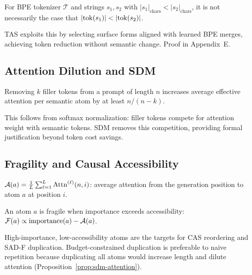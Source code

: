 \begin{theorem}
\label{thm:non-monotonicity}
For BPE tokenizer $\mathcal{T}$ and strings $s_1, s_2$ with $|s_1|_\text{chars} < |s_2|_\text{chars}$, it is not necessarily the case that $|\mathrm{tok}(s_1)| < |\mathrm{tok}(s_2)|$.
\end{theorem}

TAS exploits this by selecting surface forms aligned with learned BPE merges, achieving token reduction without semantic change.
Proof in Appendix~E.

\subsection{Attention Dilution and SDM}

\begin{proposition}
\label{prop:sdm-attention}
Removing $k$ filler tokens from a prompt of length $n$ increases average effective attention per semantic atom by at least $n/(n-k)$.
\end{proposition}

This follows from softmax normalization: filler tokens compete for attention weight with semantic tokens.
SDM removes this competition, providing formal justification beyond token cost savings.

\subsection{Fragility and Causal Accessibility}

\begin{definition}
\label{def:causal-accessibility}
$\mathcal{A}(a) = \frac{1}{L} \sum_{\ell=1}^{L} \mathrm{Attn}^{(\ell)}(n, i)$: average attention from the generation position to atom $a$ at position $i$.
\end{definition}

\begin{definition}[Fragility]
\label{def:fragility-gap}
An atom $a$ is fragile when importance exceeds accessibility: $\mathcal{F}(a) \propto \text{importance}(a) - \mathcal{A}(a)$.
\end{definition}

High-importance, low-accessibility atoms are the targets for CAS reordering and SAD-F duplication.
Budget-constrained duplication is preferable to naive repetition because duplicating all atoms would increase length and dilute attention (Proposition~\ref{prop:sdm-attention}).
